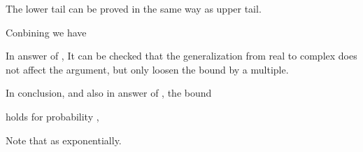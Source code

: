 {
\I The lower tail can be proved in the same way as upper tail.

\I Conbining we have
}
{
\I In answer of , It can be checked that the generalization from real to complex does not affect the argument, but only loosen the bound by a multiple.

\I In conclusion, and also in answer of , the bound

\I holds for probability , 

\I Note that  as  exponentially.
}
